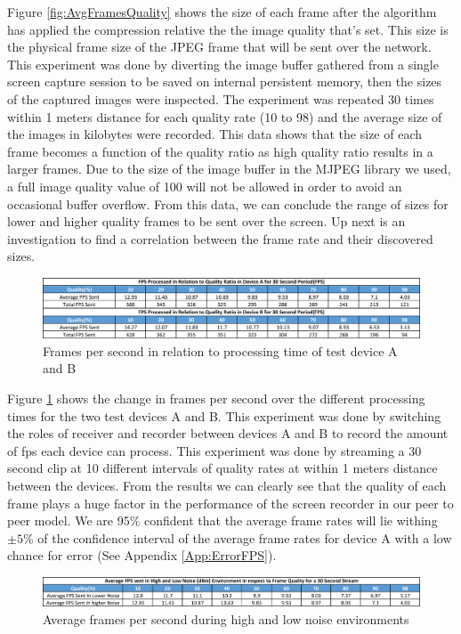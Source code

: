 \documentclass[a4paper,12pt]{article}
\begin{document}
Figure \ref{fig:AvgFramesQuality} shows the size of each frame after the algorithm has applied the compression relative the the image quality that’s set. This size is the physical frame size of the JPEG frame that will be sent over the network. This experiment was done by diverting the image buffer gathered from a single screen capture session to be saved on internal persistent memory, then the sizes of the captured images were inspected. The experiment was repeated 30 times within 1 meters distance for each quality rate (10 to 98) and the average size of the images in kilobytes were recorded. This data shows that the size of each frame becomes a function of the quality ratio as high quality ratio results in a larger frames. Due to the size of the image buffer in the MJPEG library we used, a full image quality value of 100 will not be allowed in order to avoid an occasional buffer overflow. From this data, we can conclude the range of sizes for lower and higher quality frames to be sent over the screen. Up next is an investigation to find a correlation between the frame rate and their discovered sizes. 

\begin{figure}[h!]
\centering
\includegraphics[scale=.7]{Figures/Figure11.png}
\caption{Frames per second in relation to processing time of test device A and B}
\label{fig:FPSprocessingTime}
\end{figure}

Figure \ref{fig:FPSprocessingTime} shows the change in frames per second over the different processing times for the two test devices A and B. This experiment was done by switching the roles of receiver and recorder between devices A and B to record the amount of fps each device can process. This experiment was done by streaming a 30 second clip at 10 different intervals of quality rates at within 1 meters distance between the devices. From the results we can clearly see that the quality of each frame plays a huge factor in the performance of the screen recorder in our peer to peer model. We are 95\% confident that the average frame rates will lie withing $\pm 5\%$ of the confidence interval of the average frame rates for device A with a low chance for error (See Appendix \ref{App:ErrorFPS}). 

\begin{figure}[h!]
\centering
\includegraphics[scale=.285]{Figures/Figure12.png}
\caption{Average frames per second during high and low noise environments}
\label{fig:FpsNoise}
\end{figure}
\end{document}
